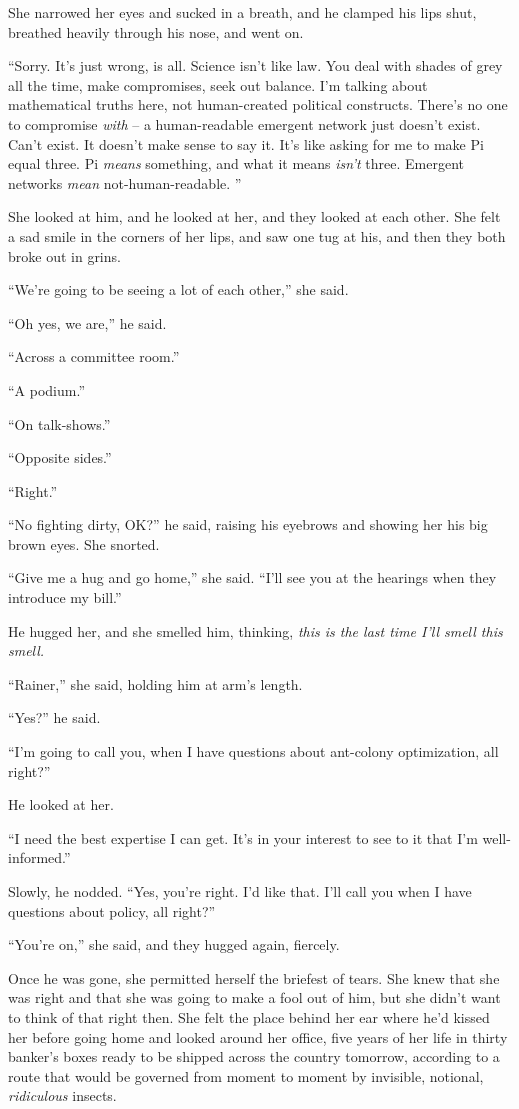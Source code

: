 She narrowed her eyes and sucked in a breath, and he clamped his lips 
shut, breathed heavily through his nose, and went on.

“Sorry. It's just wrong, is all. Science isn't like law. You deal 
with shades of grey all the time, make compromises, seek out balance. 
I'm talking about mathematical truths here, not human-created political 
constructs. There's no one to compromise \emph{with} -- a 
human-readable emergent network just doesn't exist. Can't exist. It 
doesn't make sense to say it. It's like asking for me to make Pi equal 
three. Pi \emph{means} something, and what it means \emph{isn't} three. 
Emergent networks \emph{mean} not-human-readable. ”

She looked at him, and he looked at her, and they looked at each other. 
She felt a sad smile in the corners of her lips, and saw one tug at 
his, and then they both broke out in grins.

“We're going to be seeing a lot of each other,” she said.

“Oh yes, we are,” he said.

“Across a committee room.”

“A podium.”

“On talk-shows.”

“Opposite sides.”

“Right.”

“No fighting dirty, OK?” he said, raising his eyebrows and showing 
her his big brown eyes. She snorted.

“Give me a hug and go home,” she said. “I'll see you at the 
hearings when they introduce my bill.”

He hugged her, and she smelled him, thinking, \emph{this is the last 
time I'll smell this smell.}

“Rainer,” she said, holding him at arm's length.

“Yes?” he said.

“I'm going to call you, when I have questions about ant-colony 
optimization, all right?”

He looked at her.

“I need the best expertise I can get. It's in your interest to see to 
it that I'm well-informed.”

Slowly, he nodded. “Yes, you're right. I'd like that. I'll call you 
when I have questions about policy, all right?”

“You're on,” she said, and they hugged again, fiercely.

Once he was gone, she permitted herself the briefest of tears. She knew 
that she was right and that she was going to make a fool out of him, 
but she didn't want to think of that right then. She felt the place 
behind her ear where he'd kissed her before going home and looked 
around her office, five years of her life in thirty banker's boxes 
ready to be shipped across the country tomorrow, according to a route 
that would be governed from moment to moment by invisible, notional, 
\emph{ridiculous} insects.

